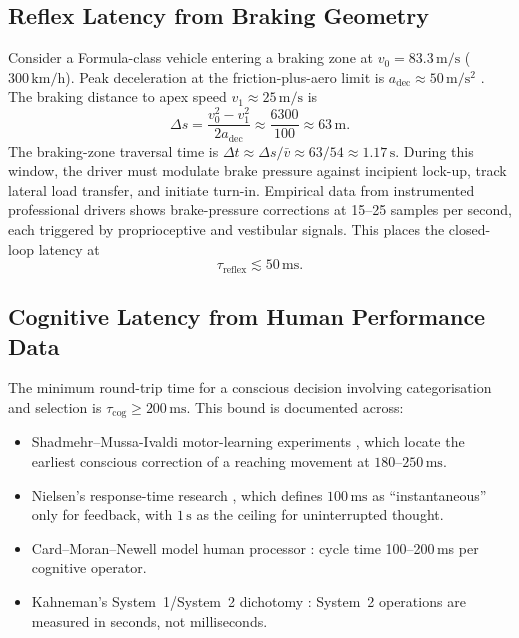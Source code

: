 \documentclass[11pt,twocolumn]{article}
\theoremstyle{definition}
\theoremstyle{remark}
\begin{document}
\subsection{Reflex Latency from Braking Geometry}

Consider a Formula-class vehicle entering a braking zone at $v_0 = 83.3\,\mathrm{m/s}$ ($300\,\mathrm{km/h}$). Peak deceleration at the friction-plus-aero limit is $a_{\mathrm{dec}} \approx 50\,\mathrm{m/s^2}$ \cite{milliken1995race,wright2001formula}. The braking distance to apex speed $v_1 \approx 25\,\mathrm{m/s}$ is
\begin{equation}
\Delta s = \frac{v_0^2 - v_1^2}{2 a_{\mathrm{dec}}} \approx \frac{6300}{100} \approx 63\,\mathrm{m}.
\end{equation}
The braking-zone traversal time is $\Delta t \approx \Delta s / \bar{v} \approx 63 / 54 \approx 1.17\,\mathrm{s}$. During this window, the driver must modulate brake pressure against incipient lock-up, track lateral load transfer, and initiate turn-in. Empirical data from instrumented professional drivers \cite{kelly2008controlvehicle,limebeer2015optimal} shows brake-pressure corrections at 15--25 samples per second, each triggered by proprioceptive and vestibular signals. This places the closed-loop latency at
\begin{equation}
\tau_{\mathrm{reflex}} \lesssim 50\,\mathrm{ms}. \label{eq:tau-reflex}
\end{equation}

\subsection{Cognitive Latency from Human Performance Data}

The minimum round-trip time for a conscious decision involving categorisation and selection is $\tau_{\mathrm{cog}} \ge 200\,\mathrm{ms}$. This bound is documented across:

\begin{itemize}[leftmargin=*,itemsep=2pt]
\item Shadmehr--Mussa-Ivaldi motor-learning experiments \cite{shadmehr2005biology}, which locate the earliest conscious correction of a reaching movement at $180$--$250\,\mathrm{ms}$.
\item Nielsen's response-time research \cite{nielsen1993response}, which defines $100\,\mathrm{ms}$ as ``instantaneous'' only for feedback, with $1\,\mathrm{s}$ as the ceiling for uninterrupted thought.
\item Card--Moran--Newell model human processor \cite{card1983psychology}: cycle time 100--200\,ms per cognitive operator.
\item Kahneman's System~1/System~2 dichotomy \cite{kahneman2011thinking}: System~2 operations are measured in seconds, not milliseconds.
\end{itemize}
\end{document}
